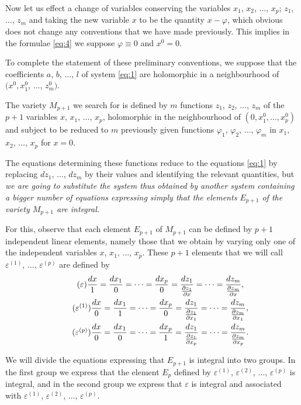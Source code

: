 \documentclass[leqno,11pt]{book}
\makeatletter
\newcommand{\pd}{\partial}
\theoremstyle{shape1}
\theoremstyle{shapesmall}
\let\old@phi\phi
\let\old@varphi\varphi
\let\old@epsilon\epsilon
\let\old@varepsilon\varepsilon
\let\phi\old@varphi
\let\varphi\old@phi
\let\epsilon\old@varepsilon
\let\varepsilon\old@epsilon
\makeatother
\begin{document}
Now let us effect a change of variables conserving the variables $x_{1}$, $x_{2}$, $\dots$, $x_{p}$; $z_{1}$, $\dots$, $z_{m}$ and taking the new variable $x$ to be the quantity $x-\phi$, which obvious does not change any conventions that we have made previously. This implies in the formulae \eqref{eq:4} we suppose $\phi\equiv 0$ and $x^{0}=0$.

To complete the statement of these preliminary conventions, we suppose that the coefficients $a$, $b$, $\dots$, $l$ of system \eqref{eq:1} are holomorphic in a neighbourhood of $(x^{0},x_{1}^{0}$, $\dots$, $z_{m}^{0})$.

The variety $M_{p+1}$ we search for is defined by $m$ functions $z_{1}$, $z_{2}$, $\dots$, $z_{m}$ of the $p+1$ variables $x$, $x_{1}$, $\dots$, $x_{p}$, holomorphic in the neighbourhood of $(0,x_{1}^{0},\dots, x^{0}_{p})$ and subject to be reduced to $m$ previously given functions $\phi_{1}$, $\phi_{2}$, $\dots$, $\phi_{m}$ in $x_{1}$, $x_{2}$, $\dots$, $x_{p}$ for $x=0$.

The equations determining these functions reduce to the equations \eqref{eq:1} by replacing $dz_{1}$, $\dots$, $dz_{m}$ by their values and identifying the relevant quantities, but \emph{we are going to substitute the system thus obtained by another system containing a bigger number of equations expressing simply that the elements $E_{p+1}$ of the variety $M_{p+1}$ are integral.} 

For this, observe that each element $E_{p+1}$ of $M_{p+1}$ can be defined by $p+1$ independent linear elements, namely those that we obtain by varying only one of the independent variables $x$, $x_{1}$, $\dots$, $x_{p}$. These $p+1$ elements that we will call $\epsilon^{(1)}$, $\dots$, $\epsilon^{(p)}$ are defined by
\begin{gather}
  \label{eq:eg}\tag{$\epsilon$}
  \frac{dx}{1}=\frac{dx_{1}}{0}=\dots=\frac{dx_{p}}{0}=\frac{dz_{1}}{\frac{\pd z_{1}}{\pd x}}=\dots=\frac{dz_{m}}{\frac{\pd z_{m}}{\pd x}},\\
  \label{eq:e1g}\tag{$\epsilon^{(1)}$}
  \frac{dx}{0}=\frac{dx_{1}}{1}=\dots=\frac{dx_{p}}{0}=\frac{dz_{1}}{\frac{\pd z_{1}}{\pd x_{1}}}=\dots=\frac{dz_{m}}{\frac{\pd z_{m}}{\pd x_{1}}},\\
  \label{eq:epg}\tag{$\epsilon^{(p)}$}
  \frac{dx}{0}=\frac{dx_{1}}{0}=\dots=\frac{dx_{p}}{1}=\frac{dz_{1}}{\frac{\pd z_{1}}{\pd x_{p}}}=\dots=\frac{dz_{m}}{\frac{\pd z_{m}}{\pd x_{p}}}.
\end{gather}

We will divide the equations expressing that $E_{p+1}$ is integral into two groups. In the first group we express that the element $E_{p}$ defined by $\epsilon^{(1)}$, $\epsilon^{(2)}$, $\dots$, $\epsilon^{(p)}$ is integral, and in the second group we express that $\epsilon$ is integral and associated with $\epsilon^{(1)}$, $\epsilon^{(2)}$, $\dots$, $\epsilon^{(p)}$.
\end{document}
